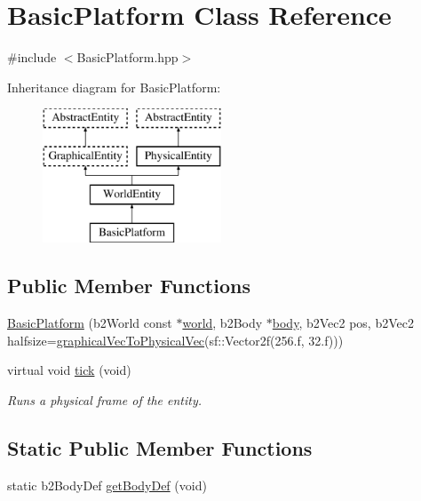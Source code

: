 \hypertarget{class_basic_platform}{}\section{Basic\+Platform Class Reference}
\label{class_basic_platform}


{\ttfamily \#include $<$Basic\+Platform.\+hpp$>$}

Inheritance diagram for Basic\+Platform\+:\begin{figure}[H]
\begin{center}
\leavevmode
\includegraphics[height=4.000000cm]{class_basic_platform}
\end{center}
\end{figure}
\subsection*{Public Member Functions}
\begin{DoxyCompactItemize}
\item 
\hyperlink{class_basic_platform_aa1c83ff7f1a2f29de3b3e5beb75356ae}{Basic\+Platform} (b2\+World const $\ast$\hyperlink{class_physical_entity_ae6c23c3817c4d7f9a867abed05cd7834}{world}, b2\+Body $\ast$\hyperlink{class_physical_entity_a91a5016393dd890c490b329abd938ec7}{body}, b2\+Vec2 pos, b2\+Vec2 halfsize=\hyperlink{sfml_to_box2_d_8hpp_ae4470ad6d4f3e86df57412ae3dd3dbbc}{graphical\+Vec\+To\+Physical\+Vec}(sf\+::\+Vector2f(256.f, 32.f)))
\item 
virtual void \hyperlink{class_basic_platform_a4f48429408329c4b0bb8924e410ad44e}{tick} (void)
\begin{DoxyCompactList}\small\item\em Runs a physical frame of the entity. \end{DoxyCompactList}\end{DoxyCompactItemize}
\subsection*{Static Public Member Functions}
\begin{DoxyCompactItemize}
\item 
static b2\+Body\+Def \hyperlink{class_basic_platform_ab7dd53f396448d87598661c48696cd9f}{get\+Body\+Def} (void)
\end{DoxyCompactItemize}
